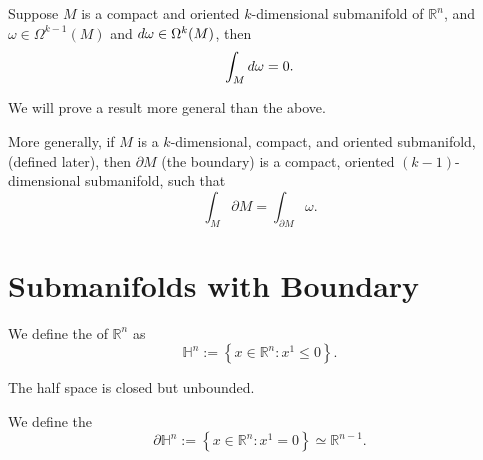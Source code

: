 \documentclass[notoc,notitlepage]{tufte-book}
\begin{document}
\begin{thm}\label{thm:stokes_theorem_first}
  Suppose $M$ is a compact and oriented $k$-dimensional submanifold of
  $\mathbb{R}^n$, and $\omega \in \Omega^{k - 1}(M)$ and $\mathop{}\!d{\omega} \in
  \Omega^k(M)$, then
  \begin{equation*}
    \int_{M} \mathop{}\!d{\omega} = 0. 
  \end{equation*}
\end{thm}

We will prove a result more general than the above.

More generally, if $M$ is a $k$-dimensional, compact, and oriented submanifold,
 (defined later), then $\partial M$ (the boundary) is a
compact, oriented $(k - 1)$-dimensional submanifold, such that
\begin{equation*}
  \int_{M} \partial M = \int_{\partial M} \omega. 
\end{equation*}


\section{Submanifolds with Boundary}%
\label{sec:submanifolds_with_boundary}

\begin{defn}\label{defn:half_space}
  We define the  of $\mathbb{R}^n$ as
  \begin{equation*}
    \mathbb{H}^n := \left\{ x \in \mathbb{R}^n : x^1 \leq 0 \right\}.
  \end{equation*}
\end{defn}

\begin{note}
  The half space is closed but unbounded.
\end{note}

\begin{defn}\label{defn:boundary_of_the_half_space}
  We define the 
  \begin{equation*}
    \partial \mathbb{H}^n := \left\{ x \in \mathbb{R}^n : x^1 = 0 \right\}
    \simeq \mathbb{R}^{n - 1}.
  \end{equation*}
\end{defn}
\end{document}
